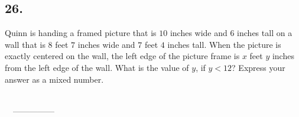 \documentclass[12pt]{article}
\begin{document}
\subsection*{26.}
Quinn is handing a framed picture that is $10$ inches wide and $6$ inches tall on a wall that is $8$ feet $7$ inches wide and $7$ feet $4$ inches tall. When the picture is exactly centered on the wall, the left edge of the picture frame is $x$ feet $y$ inches from the left edge of the wall. What is the value of $y$, if $y<12$? Express your answer as a mixed number.

\nopagebreak

\begin{minipage}[b]{\linewidth}
\phantom{ANSWER}\hspace{14pt}\fbox{\phantom{ANSWER}}\\
\fbox{\phantom{ANSWER}}~~\mbox{---------------}\\
\phantom{ANSWER}\hspace{14pt}\fbox{\phantom{ANSWER}}

\end{minipage}
\end{document}
